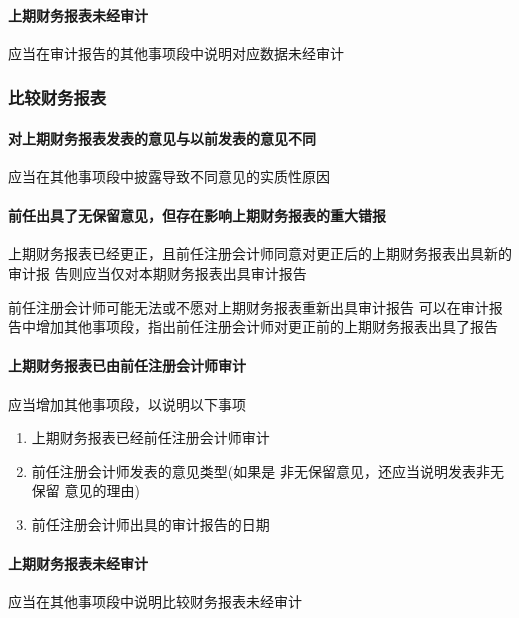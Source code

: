 \documentclass[UTF8,12pt]{ctexart}
\numberwithin{equation}{section} %
\numberwithin{figure}{section}
\numberwithin{table}{section}
\begin{document}
	\paragraph{上期财务报表未经审计}
	
	应当在审计报告的其他事项段中说明对应数据未经审计
	
	\subsubsection{比较财务报表}
	\paragraph{对上期财务报表发表的意见与以前发表的意见不同} 应当在其他事项段中披露导致不同意见的实质性原因
	
	
	\paragraph{前任出具了无保留意见，但存在影响上期财务报表的重大错报} 
	上期财务报表已经更正，且前任注册会计师同意对更正后的上期财务报表出具新的审计报 告则应当仅对本期财务报表出具审计报告 
	
	前任注册会计师可能无法或不愿对上期财务报表重新出具审计报告    可以在审计报告中增加其他事项段，指出前任注册会计师对更正前的上期财务报表出具了报告
	
	\paragraph{上期财务报表已由前任注册会计师审计}
	应当增加其他事项段，以说明以下事项
	\begin{enumerate}
		\item 上期财务报表已经前任注册会计师审计
		
		\item  前任注册会计师发表的意见类型(如果是 非无保留意见，还应当说明发表非无保留 意见的理由)
		
		\item 前任注册会计师出具的审计报告的日期 
	\end{enumerate}


	\paragraph{上期财务报表未经审计} 应当在其他事项段中说明比较财务报表未经审计
	
\end{document}
